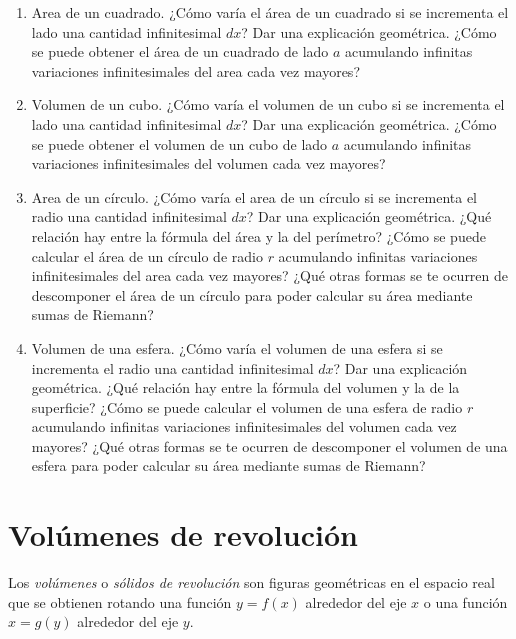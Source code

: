 \documentclass[
  a4paper,
]{scrreport}
\begin{document}
\begin{enumerate}
\def\labelenumi{\arabic{enumi}.}
\item
  Area de un cuadrado. ¿Cómo varía el área de un cuadrado si se
  incrementa el lado una cantidad infinitesimal \(dx\)? Dar una
  explicación geométrica. ¿Cómo se puede obtener el área de un cuadrado
  de lado \(a\) acumulando infinitas variaciones infinitesimales del
  area cada vez mayores?
\item
  Volumen de un cubo. ¿Cómo varía el volumen de un cubo si se incrementa
  el lado una cantidad infinitesimal \(dx\)? Dar una explicación
  geométrica. ¿Cómo se puede obtener el volumen de un cubo de lado \(a\)
  acumulando infinitas variaciones infinitesimales del volumen cada vez
  mayores?
\item
  Area de un círculo. ¿Cómo varía el area de un círculo si se incrementa
  el radio una cantidad infinitesimal \(dx\)? Dar una explicación
  geométrica. ¿Qué relación hay entre la fórmula del área y la del
  perímetro? ¿Cómo se puede calcular el área de un círculo de radio
  \(r\) acumulando infinitas variaciones infinitesimales del area cada
  vez mayores? ¿Qué otras formas se te ocurren de descomponer el área de
  un círculo para poder calcular su área mediante sumas de Riemann?
\item
  Volumen de una esfera. ¿Cómo varía el volumen de una esfera si se
  incrementa el radio una cantidad infinitesimal \(dx\)? Dar una
  explicación geométrica. ¿Qué relación hay entre la fórmula del volumen
  y la de la superficie? ¿Cómo se puede calcular el volumen de una
  esfera de radio \(r\) acumulando infinitas variaciones infinitesimales
  del volumen cada vez mayores? ¿Qué otras formas se te ocurren de
  descomponer el volumen de una esfera para poder calcular su área
  mediante sumas de Riemann?
\end{enumerate}


\hypertarget{voluxfamenes-de-revoluciuxf3n}{%
\chapter{Volúmenes de revolución}\label{voluxfamenes-de-revoluciuxf3n}}

Los \emph{volúmenes} o \emph{sólidos de revolución} son figuras
geométricas en el espacio real que se obtienen rotando una función
\(y=f(x)\) alrededor del eje \(x\) o una función \(x=g(y)\) alrededor
del eje \(y\).
\end{document}
